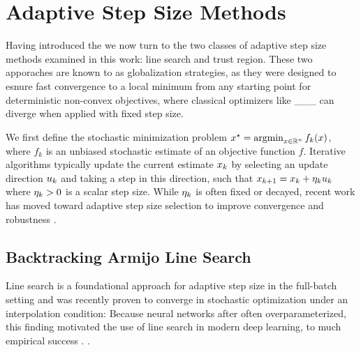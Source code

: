 \section{Adaptive Step Size Methods}
Having introduced the %
we now turn to the two classes of adaptive step size methods examined in this work: line search and trust region. These two apporaches are known to as globalization strategies, as they were designed to esnure fast convergence to a local minimum from any starting point for deterministic non-convex objectives, where classical optimizers like ___ can diverge when applied with fixed step size. %

We first define the stochastic minimization problem  $x^\star = \operatorname{argmin}_{x \in \mathbb{R}^n} f_k(x)$, where $f_k$ is an unbiased stochastic estimate of an objective function $f$. %
Iterative algorithms typically update the current estimate $x_{k}$ by selecting an update direction $u_{k}$ and taking a step in this direction, such that $x_{k+1} = x_{k} + \eta_{k} u_{k}$ where $\eta_{k} > 0$ is a scalar step size. While $\eta_{k}$ is often fixed or decayed, recent work has moved toward adaptive step size selection to improve convergence and robustness . 

\subsection{Backtracking Armijo Line Search}
Line search is a foundational approach for adaptive step size in the full-batch setting and was recently proven to converge in stochastic optimization \cite{vaswani2019painless} under an interpolation condition:  
Because neural networks after often overparameterized, this finding motivated the use of line search in modern deep learning, to much empirical success \cite{vaswani2025armijo, galli2023monotone, fox2024nonmonotone, fox2024glocal}. %
.

